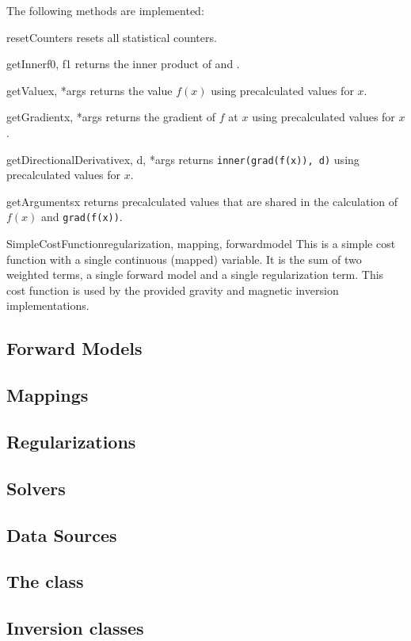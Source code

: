\noindent The following methods are implemented:
%
\begin{methoddesc}[CostFunction]{resetCounters}{}
    resets all statistical counters.
\end{methoddesc}
%
\begin{methoddesc}[CostFunction]{getInner}{f0, f1}
    returns the inner product of  and .
\end{methoddesc}
%
\begin{methoddesc}[CostFunction]{getValue}{x, *args}
    returns the value $f(x)$ using precalculated values for $x$.
\end{methoddesc}
%
\begin{methoddesc}[CostFunction]{getGradient}{x, *args}
    returns the gradient of $f$ at $x$ using precalculated values for $x$.
\end{methoddesc}
%
\begin{methoddesc}[CostFunction]{getDirectionalDerivative}{x, d, *args}
    returns \texttt{inner(grad(f(x)), d)} using precalculated values for $x$.
\end{methoddesc}
%
\begin{methoddesc}[CostFunction]{getArguments}{x}
    returns precalculated values that are shared in the calculation of $f(x)$
    and \texttt{grad(f(x))}.
\end{methoddesc}

\begin{classdesc}{SimpleCostFunction}{regularization, mapping, forwardmodel}
    This is a simple cost function with a single continuous (mapped) variable.
    It is the sum of two weighted terms, a single forward model and a single
    regularization term. This cost function is used by the provided gravity
    and magnetic inversion implementations.
\end{classdesc}


\subsection{Forward Models}

\subsection{Mappings}

\subsection{Regularizations}

\subsection{Solvers}

\subsection{Data Sources}

\subsection{The  class}

\subsection{Inversion classes}

